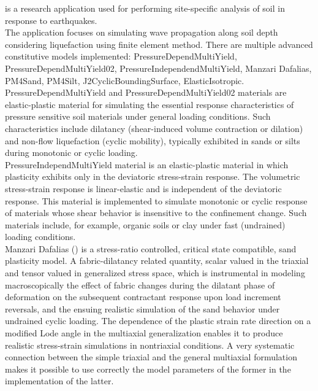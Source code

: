 \texttt{\getsoftwarename{}} is a research application used for performing site-specific analysis of soil in  response to earthquakes. \\


The application focuses on simulating wave propagation along soil depth considering liquefaction 
 using finite element method. There are multiple  advanced constitutive  models implemented: 
PressureDependMultiYield, PressureDependMultiYield02, PressureIndependendMultiYield,
Manzari Dafalias, PM4Sand, PM4Silt, J2CyclicBoundingSurface, ElasticIsotropic.\\

PressureDependMultiYield and PressureDependMultiYield02 materials are elastic-plastic material for simulating the essential response characteristics of pressure sensitive soil materials under general loading conditions. Such characteristics include dilatancy (shear-induced volume contraction or dilation) and non-flow liquefaction (cyclic mobility), typically exhibited in sands or silts during monotonic or cyclic loading.\\



 PressureIndependMultiYield material is an elastic-plastic material in which plasticity exhibits only in the deviatoric stress-strain response. The volumetric stress-strain response is linear-elastic and is independent of the deviatoric response. This material is implemented to simulate monotonic or cyclic response of materials whose shear behavior is insensitive to the confinement change. Such materials include, for example, organic soils or clay under fast (undrained) loading conditions.\\

Manzari Dafalias (\cite{dafalias2004simple}) is a stress-ratio controlled, critical state compatible, sand plasticity model.
A fabric-dilatancy related quantity, scalar valued in the triaxial and tensor valued in generalized stress space, which is instrumental in modeling macroscopically the effect of fabric changes during the dilatant phase of deformation on the subsequent contractant response upon load increment reversals, and the ensuing realistic simulation of the sand behavior under undrained cyclic loading.  The dependence of the plastic strain rate direction on a modified Lode angle in the multiaxial generalization enables it to produce realistic stress-strain simulations in nontriaxial conditions. A very systematic connection between the simple triaxial and the general multiaxial formulation makes it possible to use correctly the model parameters of the former in the implementation of the latter. \\



